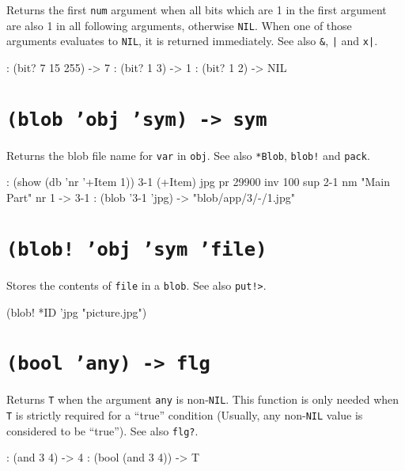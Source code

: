 Returns the first \texttt{num} argument when all bits which are 1 in the first
argument are also 1 in all following arguments, otherwise \texttt{NIL}. When
one of those arguments evaluates to \texttt{NIL}, it is returned immediately.
See also \texttt{\&}, \texttt{|} and \texttt{x|}.


\begin{wideverbatim}
: (bit? 7 15 255)
-> 7
: (bit? 1 3)
-> 1
: (bit? 1 2)
-> NIL
\end{wideverbatim}

 
\section*{\texttt{(blob 'obj 'sym) -> sym}}
\label{sec:funct-ref-B-(blob-'obj-'sym)-->-sym}


Returns the blob file name for \texttt{var} in \texttt{obj}. See also \texttt{*Blob}, \texttt{blob!}
and \texttt{pack}.


\begin{wideverbatim}
: (show (db 'nr '+Item 1))
{3-1} (+Item)
   jpg
   pr 29900
   inv 100
   sup {2-1}
   nm "Main Part"
   nr 1
-> {3-1}
: (blob '{3-1} 'jpg)
-> "blob/app/3/-/1.jpg"
\end{wideverbatim}

 
\section*{\texttt{(blob! 'obj 'sym 'file)}}
\label{sec:funct-ref-B-(blob!-'obj-'sym-'file)}


Stores the contents of \texttt{file} in a \texttt{blob}. See also \texttt{put!>}.


\begin{wideverbatim}
(blob! *ID 'jpg "picture.jpg")
\end{wideverbatim}

 
\section*{\texttt{(bool 'any) -> flg}}
\label{sec:funct-ref-B-(bool-'any)-->-flg}


Returns \texttt{T} when the argument \texttt{any} is non-\texttt{NIL}. This function is only
needed when \texttt{T} is strictly required for a ``true'' condition (Usually,
any non-\texttt{NIL} value is considered to be ``true''). See also \texttt{flg?}.


\begin{wideverbatim}
: (and 3 4)
-> 4
: (bool (and 3 4))
-> T
\end{wideverbatim}

